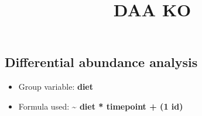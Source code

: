 \documentclass[
]{article}
\title{DAA KO}
\author{}
\date{}
\providecommand{\tightlist}{%
  \setlength{\itemsep}{0pt}\setlength{\parskip}{0pt}}\usepackage{longtable,booktabs,array}
\begin{document}
\maketitle


\subsection{Differential abundance
analysis}\label{differential-abundance-analysis}

\begin{itemize}
\tightlist
\item
  Group variable: \textbf{diet}
\item
  Formula used: \textbf{\textasciitilde{} diet * timepoint + (1
  \textbar{} id)}
\end{itemize}
\end{document}
